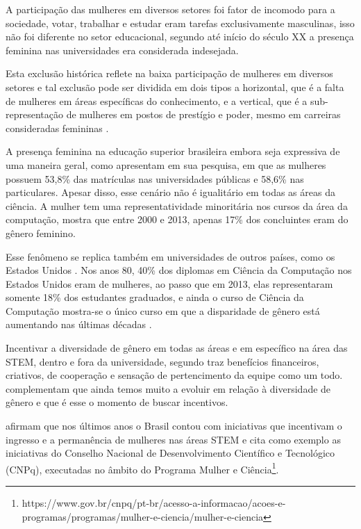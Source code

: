 A participação das mulheres em diversos setores foi fator de incomodo para a sociedade, votar, trabalhar e estudar eram tarefas exclusivamente masculinas, isso não foi diferente no setor educacional, segundo  até início do século XX a presença feminina  nas universidades era considerada indesejada.

Esta exclusão histórica reflete na baixa participação de mulheres em diversos setores e tal exclusão pode ser dividida em dois tipos a horizontal, que é a falta de  mulheres em áreas específicas
do conhecimento, e a vertical, que é a sub-representação de mulheres em postos de prestígio e poder, mesmo em carreiras consideradas femininas \cite{araujoM:2020}. 

A presença feminina na educação superior brasileira embora seja expressiva de uma maneira geral, como  apresentam em sua pesquisa, em que as mulheres possuem 53,8\% das matrículas nas universidades públicas e 58,6\% nas particulares. Apesar disso, esse cenário não é igualitário em todas as áreas da ciência. A mulher tem uma representatividade minoritária nos cursos da área da computação,  mostra que entre 2000 e 2013, apenas 17\% dos concluintes eram do gênero feminino.

Esse fenômeno se replica também em universidades de outros países, como os Estados Unidos \cite{lunn:2021}. Nos anos 80, 40\% dos diplomas em Ciência da Computação nos Estados Unidos eram de mulheres, ao passo que em 2013, elas representaram somente 18\% dos estudantes graduados, e ainda o curso de Ciência da Computação mostra-se o único curso em que a disparidade de gênero está aumentando nas últimas décadas \cite{NCWIT:2020}.

Incentivar a diversidade de gênero em todas as áreas e em específico na área das STEM, dentro e fora da universidade, segundo  traz benefícios financeiros, criativos, de cooperação e sensação de pertencimento da equipe como um todo.  complementam que ainda temos muito a evoluir em relação à diversidade de gênero e que é esse o momento de buscar incentivos.

 afirmam que nos últimos anos o Brasil contou com iniciativas que incentivam o ingresso e a permanência de mulheres nas áreas STEM e cita como exemplo as iniciativas do Conselho Nacional
de Desenvolvimento Científico e Tecnológico (CNPq), executadas no âmbito do Programa
Mulher e Ciência\footnote{https://www.gov.br/cnpq/pt-br/acesso-a-informacao/acoes-e-programas/programas/mulher-e-ciencia/mulher-e-ciencia}.

